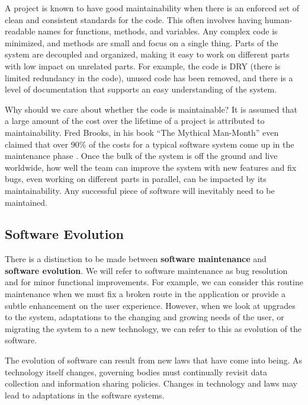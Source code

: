 \documentclass[12pt,conference]{IEEEtran}
\begin{document}
A project is known to have good maintainability when there is an enforced set of clean and consistent standards for the code. This often involves having human-readable names for functions, methods, and variables. Any complex code is minimized, and methods are small and focus on a single thing. Parts of the system are decoupled and organized, making it easy to work on different parts with low impact on unrelated parts. For example, the code is DRY (there is limited redundancy in the code), unused code has been removed, and there is a level of documentation that supports an easy understanding of the system.

Why should we care about whether the code is maintainable? It is assumed that a large amount of the cost over the lifetime of a project is attributed to maintainability. Fred Brooks, in his book ``The Mythical Man-Month'' even claimed that over 90\% of the costs for a typical software system come up in the maintenance phase \cite{brooks:mythical}. Once the bulk of the system is off the ground and live worldwide, how well the team can improve the system with new features and fix bugs, even working on different parts in parallel, can be impacted by its maintainability. Any successful piece of software will inevitably need to be maintained.

\vspace{0.25cm}
\subsection{Software Evolution}

There is a distinction to be made between \textbf{software maintenance} and \textbf{software evolution}. We will refer to software maintenance as bug resolution and for minor functional improvements. For example, we can consider this routine maintenance when we must fix a broken route in the application or provide a subtle enhancement on the user experience. However, when we look at upgrades to the system, adaptations to the changing and growing needs of the user, or migrating the system to a new technology, we can refer to this as evolution of the software.

The evolution of software can result from new laws that have come into being. As technology itself changes, governing bodies must continually revisit data collection and information sharing policies. Changes in technology and laws may lead to adaptations in the software systems.
\end{document}
